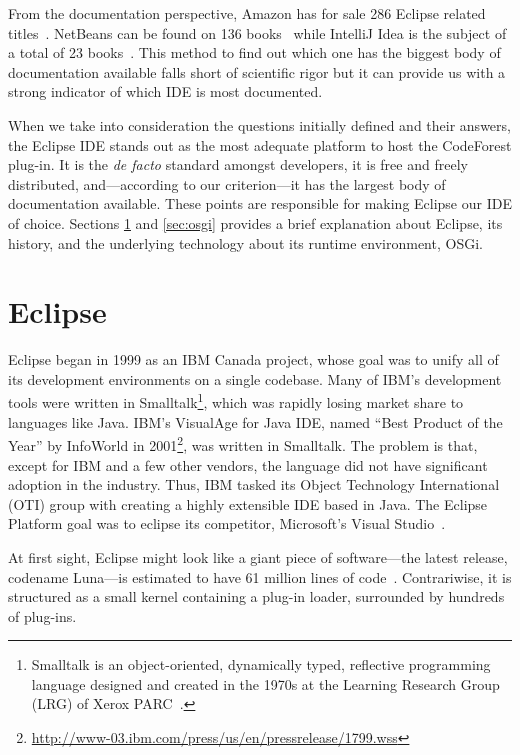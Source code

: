 From the documentation perspective, Amazon has for sale 286 Eclipse related
titles~\cite{amazon2014eclipse}. NetBeans can be found on 136
books~\cite{amazon2014netbeans} while IntelliJ Idea is the subject of a total of
23 books~\cite{amazon2014intellij}. This method to find out which one has the
biggest body of documentation available falls short of scientific rigor but it
can provide us with a strong indicator of which IDE is most documented.

When we take into consideration the questions initially defined and their
answers, the Eclipse IDE stands out as the most adequate platform to host the
CodeForest plug-in. It is the \textit{de facto} standard amongst developers, it
is free and freely distributed, and---according to our criterion---it has the
largest body of documentation available. These points are responsible for making
Eclipse our IDE of choice. Sections \ref{sec:eclipse} and \ref{sec:osgi}
provides a brief explanation about Eclipse, its history, and the underlying
technology about its runtime environment, OSGi.

\section{Eclipse}\label{sec:eclipse}

Eclipse began in 1999 as an IBM Canada project, whose goal was to unify all of
its development environments on a single codebase. Many of IBM's development
tools were written in Smalltalk\footnote{Smalltalk is an object-oriented,
dynamically typed, reflective programming language designed and created in the 1970s at the
Learning Research Group (LRG) of Xerox PARC~\cite{myers1998brief}.}, which was
rapidly losing market share to languages like Java. IBM's VisualAge for Java
IDE, named ``Best Product of the Year'' by InfoWorld in
2001\footnote{\url{http://www-03.ibm.com/press/us/en/pressrelease/1799.wss}},
was written in Smalltalk. The problem is that, except for IBM and a few other
vendors, the language did not have significant adoption in the industry. Thus,
IBM tasked its Object Technology International (OTI) group with creating a
highly extensible IDE based in Java. The Eclipse Platform goal was to eclipse
its competitor, Microsoft's Visual Studio~\cite{clayberg2008eclipse}.

At first sight, Eclipse might look like a giant piece of software---the latest
release, codename Luna---is estimated to have 61 million lines of
code~\cite{taft2014luna}. Contrariwise, it is structured as a small kernel
containing a plug-in loader, surrounded by hundreds of plug-ins.


